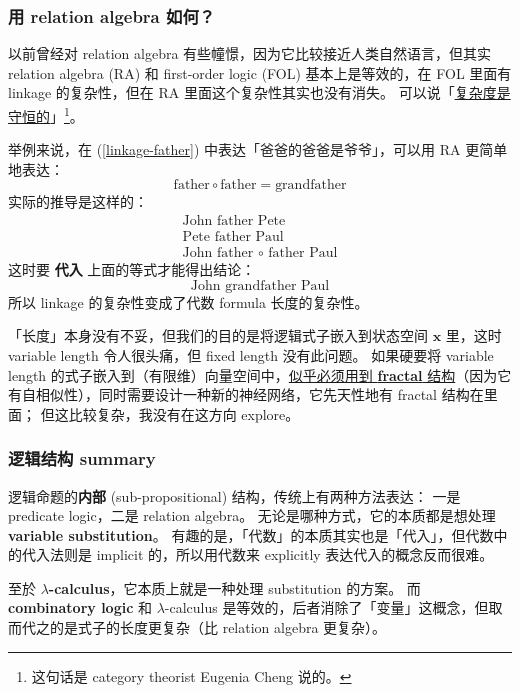 \documentclass[orivec]{llncs}
\newcommand{\emp}[1]{\textbf{\textcolor{Cerulean}{#1}}}
\newcommand{\vect}[1]{\boldsymbol{#1}}
\begin{document}
\subsubsection{用 relation algebra 如何？}

以前曾经对 relation algebra \cite{Schmidt2010} \cite{Maddux2006} 有些幢憬，因为它比较接近人类自然语言，但其实 relation algebra (RA) 和 first-order logic (FOL) 基本上是等效的，在 FOL 里面有 linkage 的复杂性，但在 RA 里面这个复杂性其实也没有消失。 可以说「\underline{复杂度是守恒的}」\footnote{这句话是 category theorist Eugenia Cheng 说的。}。

举例来说，在 (\ref{linkage-father}) 中表达「爸爸的爸爸是爷爷」，可以用 RA 更简单地表达：
\begin{equation}
 \mbox{father} \circ \mbox{father} = \mbox{grandfather}
\end{equation}
实际的推导是这样的：
\begin{eqnarray}
\mbox{John father Pete} \nonumber \\
\mbox{Pete father Paul} \nonumber \\
\mbox{John father $\circ$ father Paul} 
\end{eqnarray}
这时要 \emp{代入} 上面的等式才能得出结论：
\begin{equation}
\mbox{John grandfather Paul}
\end{equation}
所以 linkage 的复杂性变成了代数 formula 长度的复杂性。 

「长度」本身没有不妥，但我们的目的是将逻辑式子嵌入到状态空间 $\vect{x}$ 里，这时 variable length 令人很头痛，但 fixed length 没有此问题。 如果硬要将 variable length 的式子嵌入到（有限维）向量空间中，\uline{似乎必须用到 \emp{fractal} 结构}（因为它有自相似性），同时需要设计一种新的神经网络，它先天性地有 fractal 结构在里面； 但这比较复杂，我没有在这方向 explore。

\subsubsection{逻辑结构 summary}

逻辑命题的\textbf{内部} (sub-propositional) 结构，传统上有两种方法表达： 一是 predicate logic，二是 relation algebra。 无论是哪种方式，它的本质都是想处理 \emp{variable substitution}。 有趣的是，「代数」的本质其实也是「代入」，但代数中的代入法则是 implicit 的，所以用代数来 explicitly 表达代入的概念反而很难。

至於 \emp{$\lambda$-calculus}，它本质上就是一种处理 substitution 的方案。 而 \emp{combinatory logic} 和 $\lambda$-calculus 是等效的，后者消除了「变量」这概念，但取而代之的是式子的长度更复杂（比 relation algebra 更复杂）。
\end{document}

